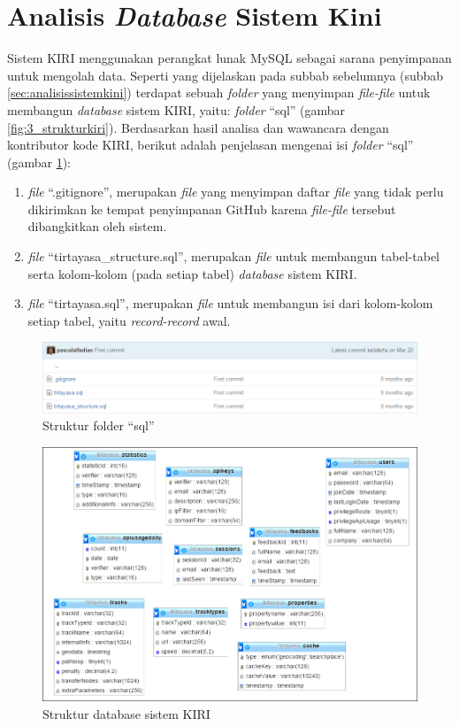 \section{Analisis \textit{Database} Sistem Kini}
\label{sec:analisisdatabasesistemkini}
Sistem KIRI menggunakan perangkat lunak MySQL sebagai sarana penyimpanan untuk mengolah data. Seperti yang dijelaskan pada subbab sebelumnya (subbab \ref{sec:analisissistemkini}) terdapat sebuah \textit{folder} yang menyimpan \textit{file-file} untuk membangun \textit{database} sistem KIRI, yaitu: \textit{folder} ``sql'' (gambar \ref{fig:3_strukturkiri}). Berdasarkan hasil analisa dan wawancara dengan kontributor kode KIRI, berikut adalah penjelasan mengenai isi \textit{folder} ``sql'' (gambar \ref{fig:4_struktursql}):
\begin{enumerate}
	\item \textit{file} ``.gitignore'', merupakan \textit{file} yang menyimpan daftar \textit{file} yang tidak perlu dikirimkan ke tempat penyimpanan GitHub karena \textit{file-file} tersebut dibangkitkan oleh sistem.
	\item \textit{file} ``tirtayasa\_structure.sql'', merupakan \textit{file} untuk membangun tabel-tabel serta kolom-kolom (pada setiap tabel) \textit{database} sistem KIRI.
	\item \textit{file} ``tirtayasa.sql'', merupakan \textit{file} untuk membangun isi dari kolom-kolom setiap tabel, yaitu \textit{record-record} awal.
\end{enumerate}

\begin{figure}[htbp]
	\centering
		\includegraphics[scale=0.5]{Gambar/4_struktursql.png}
	\caption{Struktur folder ``sql''}
	\label{fig:4_struktursql}
\end{figure}

\begin{figure}[htbp]
	\centering
		\includegraphics[scale=0.7]{Gambar/4_strukturdatabase.PNG}
	\caption{Struktur database sistem KIRI}
	\label{fig:4_strukturdatabase}
\end{figure}


